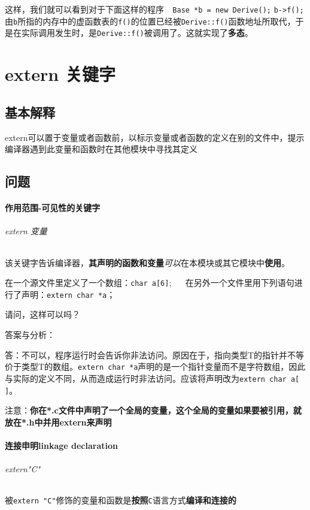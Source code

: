 \documentclass[UTF8,a4paper,12pt]{ctexbook} %
\begin{document}
	         这样，我们就可以看到对于下面这样的程序\verb|  Base *b = new Derive();| \verb|b->f();|由\verb|b|所指的内存中的虚函数表的\verb|f()|的位置已经被\verb|Derive::f()|函数地址所取代，于是在实际调用发生时，是\verb|Derive::f()|被调用了。这就实现了\textbf{多态}。
	         
\chapter{extern 关键字}
       
     \section{基本解释}extern可以置于变量或者函数前，以标示变量或者函数的定义在别的文件中，提示编译器遇到此变量和函数时在其他模块中寻找其定义
       
     \section{问题}
	     \subsubsection{作用范围-可见性的关键字}
	        \subparagraph{extern 变量}
		        该关键字告诉编译器，\textbf{其声明的函数和变量}\textit{可以}在本模块或其它模块中\textbf{使用}。
		        
		        在一个源文件里定义了一个数组：\verb|char a[6]|;
		        　
		        在另外一个文件里用下列语句进行了声明：\verb|extern char *a|；
		        
		        请问，这样可以吗？ 
		        
		        答案与分析：
		        
		        答：不可以，程序运行时会告诉你非法访问。原因在于，指向类型T的指针并不等价于类型T的数组。\verb|extern char *a|声明的是一个指针变量而不是字符数组，因此与实际的定义不同，从而造成运行时非法访问。应该将声明改为\verb|extern char a[ ]|。
		        
		        注意：{\color{blue}\textbf{你在*.c文件中声明了一个全局的变量，这个全局的变量如果要被引用，就放在*.h中并用extern来声明}}
		        
	      \subsubsection{连接申明linkage declaration}        
	        \subparagraph{extern"C"}
		        被\verb|extern "C"|修饰的变量和函数是\textbf{按照}\verb|C|语言方式\textbf{编译和连接的}
		        
\end{document}
